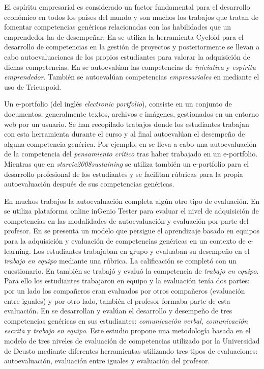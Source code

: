 El espíritu empresarial es considerado un factor fundamental para el desarrollo económico en todos los países del mundo \cite{DeXena2012educacion} y son muchos los trabajos que tratan de fomentar competencias genéricas relacionadas con las habilidades que un emprendedor ha de desempeñar. En \cite{chang2009international} se utiliza la herramienta Cycloid para el desarrollo de competencias en la gestión de proyectos y posteriormente se llevan a cabo autoevaluaciones de los propios estudiantes para valorar la adquisición de dichas competencias. En \cite{marquez2010have} se autoevalúan las competencias de \emph{iniciativa} y \emph{espíritu emprendedor}. También se autoevalúan competencias \emph{empresariales} en  \cite{achcaoucaou2014competence} mediante el uso de Tricuspoid. 

Un e-portfolio (del inglés \emph{electronic portfolio}), consiste en un conjunto de documentos, generalmente textos, archivos e imágenes, gestionados en un entorno web por un usuario. Se han recopilado trabajos donde los estudiantes trabajan con esta herramienta durante el curso y al final autoevalúan el desempeño de alguna competencia genérica. Por ejemplo, en \cite{arno2011promoting} se lleva a cabo una autoevaluación de la competencia del \emph{pensamiento crítico} tras haber trabajado en un e-portfolio. Mientras que en \emph{starcic2008sustaining} se utiliza también un e-portfolio para el desarrollo profesional de los estudiantes y se facilitan rúbricas para la propia autoevaluación después de sus competencias genéricas.

En muchos trabajos la autoevaluación completa algún otro tipo de evaluación. En \cite{sevilla2012assessment} se utiliza plataforma online inGenio Tester para evaluar el nivel de adquisición de competencias en las modalidades de autoevaluación y evaluación por parte del profesor. En \cite{ficapal2015learning} se presenta un modelo que persigue el aprendizaje basado en equipos para la adquisición y evaluación de competencias genéricas en un contexto de e-learning. Los estudiantes trabajaban en grupo y evaluaban su desempeño en el \emph{trabajo en equipo} mediante una rúbrica. La calificación se completó con un cuestionario. En \cite{khamis2012measurement} también se trabajó y evaluó la competencia de \emph{trabajo en equipo}. Para ello los estudiantes trabajaron en equipo y la evaluación tenía dos partes: por un lado los compañeros eran evaluados por otros compañeros (evaluación entre iguales) y por otro lado, también el profesor formaba parte de esta evaluación. En \cite{barbera2011assessment} se desarrollan y evalúan el desarrollo y desempeño de tres competencias genéricas en sus estudiantes: \emph{comunicación verbal}, \emph{comunicación escrita} y \emph{trabajo en equipo}. Este estudio propone una metodología basada en el modelo de tres niveles de evaluación de competencias utilizado por la Universidad de Deusto mediante diferentes herramientas utilizando tres tipos de evaluaciones: autoevaluación, evaluación entre iguales y evaluación del profesor.

